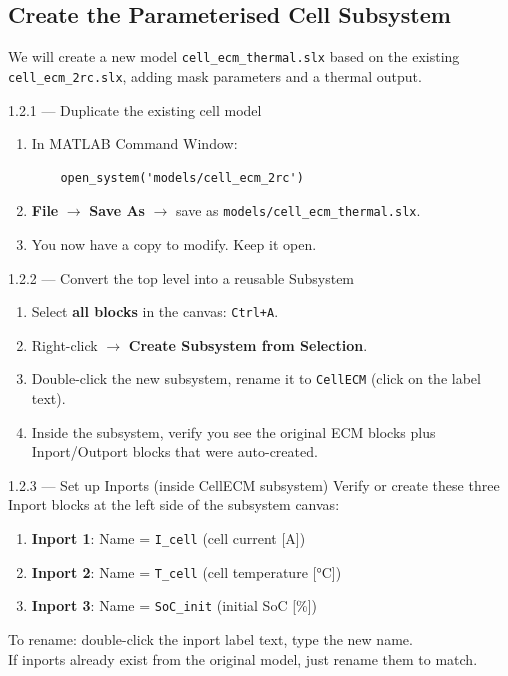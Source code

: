 \documentclass[11pt,a4paper]{article}
\begin{document}
\subsection{Create the Parameterised Cell Subsystem}

We will create a new model \texttt{cell\_ecm\_thermal.slx} based on the existing \texttt{cell\_ecm\_2rc.slx}, adding mask parameters and a thermal output.

\begin{guistep}{1.2.1 — Duplicate the existing cell model}
\begin{enumerate}
    \item In MATLAB Command Window:
    \begin{verbatim}
    open_system('models/cell_ecm_2rc')
    \end{verbatim}
    \item \textbf{File} $\to$ \textbf{Save As} $\to$ save as \texttt{models/cell\_ecm\_thermal.slx}.
    \item You now have a copy to modify. Keep it open.
\end{enumerate}
\end{guistep}

\begin{guistep}{1.2.2 — Convert the top level into a reusable Subsystem}
\begin{enumerate}
    \item Select \textbf{all blocks} in the canvas: \texttt{Ctrl+A}.
    \item Right-click $\to$ \textbf{Create Subsystem from Selection}.
    \item Double-click the new subsystem, rename it to \texttt{CellECM} (click on the label text).
    \item Inside the subsystem, verify you see the original ECM blocks plus Inport/Outport blocks that were auto-created.
\end{enumerate}
\end{guistep}

\begin{guistep}{1.2.3 — Set up Inports (inside CellECM subsystem)}
Verify or create these three Inport blocks at the left side of the subsystem canvas:
\begin{enumerate}
    \item \textbf{Inport 1}: Name = \texttt{I\_cell} \quad (cell current [A])
    \item \textbf{Inport 2}: Name = \texttt{T\_cell} \quad (cell temperature [\si{\degreeCelsius}])
    \item \textbf{Inport 3}: Name = \texttt{SoC\_init} \quad (initial SoC [\%])
\end{enumerate}
To rename: double-click the inport label text, type the new name.\\
If inports already exist from the original model, just rename them to match.
\end{guistep}
\end{document}
